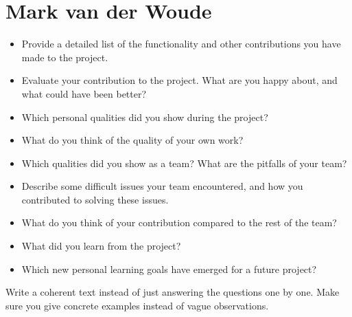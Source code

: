 \section{Mark van der Woude}
\begin{itemize}
    \item Provide a detailed list of the functionality and other 
    contributions you have made to the project.
    \item Evaluate your contribution to the project. What are you happy 
    about, and what could have been better?
    \item Which personal qualities did you show during the project?
    \item What do you think of the quality of your own work?
    \item Which qualities did you show as a team? What are the pitfalls of your team?
    \item Describe some difficult issues your team encountered, and how you 
    contributed to solving these issues.
    \item What do you think of your contribution compared to the rest of 
    the team?
    \item What did you learn from the project?
    \item Which new personal learning goals have emerged for a future project?
\end{itemize}

Write  a  coherent  text  instead  of  just  answering  the  questions  one  by  one.   Make
sure you give concrete examples instead of vague observations.
